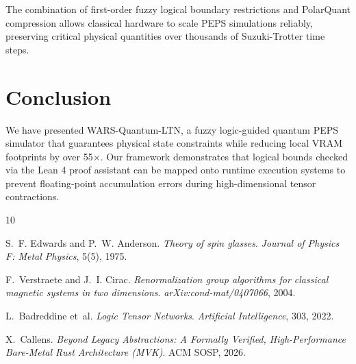 \documentclass[sigconf,nonacm=false]{acmart}
\begin{document}
The combination of first-order fuzzy logical boundary restrictions and PolarQuant compression allows classical hardware to scale PEPS simulations reliably, preserving critical physical quantities over thousands of Suzuki-Trotter time steps.

\section{Conclusion}
\label{sec:conclusion}

We have presented WARS-Quantum-LTN, a fuzzy logic-guided quantum PEPS simulator that guarantees physical state constraints while reducing local VRAM footprints by over 55$\times$. Our framework demonstrates that logical bounds checked via the Lean 4 proof assistant can be mapped onto runtime execution systems to prevent floating-point accumulation errors during high-dimensional tensor contractions.


\begin{thebibliography}{10}

S.~F. Edwards and P.~W. Anderson. \emph{Theory of spin glasses}. \emph{Journal of Physics F: Metal Physics}, 5(5), 1975.

F.~Verstraete and J.~I. Cirac. \emph{Renormalization group algorithms for classical magnetic systems in two dimensions}. \emph{arXiv:cond-mat/0407066}, 2004.

L.~Badreddine et~al. \emph{Logic Tensor Networks}. \emph{Artificial Intelligence}, 303, 2022.

X.~Callens. \emph{Beyond Legacy Abstractions: A Formally Verified, High-Performance Bare-Metal Rust Architecture (MVK)}. ACM SOSP, 2026.

\end{thebibliography}
\end{document}
